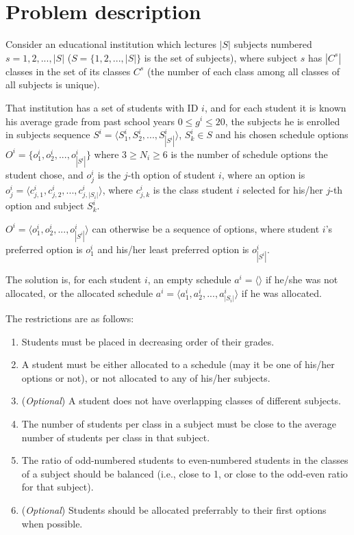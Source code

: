 \documentclass[runningheads]{llncs}
\begin{document}
\section{Problem description}

Consider an educational institution which lectures $|S|$ subjects numbered $s=1, 2, ... , |S|$ ($S = \{1, 2, ..., |S|\}$ is the set of subjects), where subject $s$ has $|C^s|$ classes in the set of its classes $C^s$ (the number of each class among all classes of all subjects is unique).

That institution has a set of students with ID $i$, and for each student it is known his average grade from past school years $0 \leq g^i \leq 20$, the subjects he is enrolled in subjects sequence $S^i = \langle S^i_1, S^i_2, ..., S^i_{|S^i|} \rangle$, $S^i_k \in S$ and his chosen schedule options $O^i = \{o^i_1, o^i_2, ..., o^i_{|S^i|}\}$ where $3 \geq N_i \geq 6$ is the number of schedule options the student chose, and $o^i_j$ is the $j$-th option of student $i$, where an option is $o^i_j = \langle c^i_{j, 1}, c^i_{j, 2}, ..., {c^i_{j, |S_i|}} \rangle$, where $c^i_{j,k}$ is the class student $i$ selected for his/her $j$-th option and subject $S^i_k$.

$O^i = \langle o^i_1, o^i_2, ..., o^i_{|S^i|} \rangle$ can otherwise be a sequence of options, where student $i$'s preferred option is $o^i_1$ and his/her least preferred option is $o^i_ {|S^i|}$.

The solution is, for each student $i$, an empty schedule $a^i=\langle \rangle$ if he/she was not allocated, or the allocated schedule $a^i = \langle a^i_1, a^i_2, ..., a^i_{|S_i|} \rangle$ if he was allocated.

The restrictions are as follows:
\begin{enumerate}
    \item Students must be placed in decreasing order of their grades.
    \item A student must be either allocated to a schedule (may it be one of his/her options or not), or not allocated to any of his/her subjects.
    \item (\textit{Optional}) A student does not have overlapping classes of different subjects.
    \item The number of students per class in a subject must be close to the average number of students per class in that subject.
    \item The ratio of odd-numbered students to even-numbered students in the classes of a subject should be balanced (i.e., close to 1, or close to the odd-even ratio for that subject).
    \item (\textit{Optional}) Students should be allocated preferrably to their first options when possible.
\end{enumerate}
\end{document}
